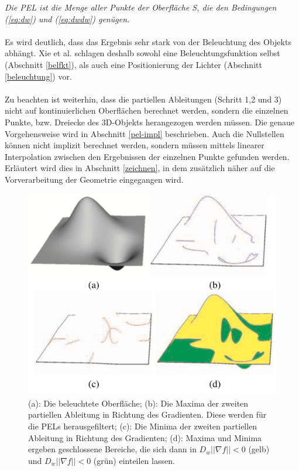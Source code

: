 \documentclass{paperStyle}
\begin{document}
\textit{Die PEL ist die Menge aller Punkte der Oberfläche S, die den Bedingungen (\ref{eq:dw}) und (\ref{eq:dwdw}) genügen.}
\\\\
Es wird deutlich, dass das Ergebnis sehr stark von der Beleuchtung des Objekts abhängt. Xie et al. schlagen deshalb sowohl eine Beleuchtungsfunktion selbst (Abschnitt \ref{belfkt}), als auch eine Positionierung der Lichter (Abschnitt \ref{beleuchtung}) vor.\\\\
Zu beachten ist weiterhin, dass die partiellen Ableitungen (Schritt 1,2 und 3) nicht auf kontinuierlichen Oberflächen berechnet werden, sondern die einzelnen Punkte, bzw. Dreiecke des 3D-Objekts herangezogen werden müssen. Die genaue Vorgehensweise wird in Abschnitt \ref{pel-impl} beschrieben. Auch die Nullstellen können nicht implizit berechnet werden, sondern müssen mittels linearer Interpolation zwischen den Ergebnissen der einzelnen Punkte gefunden werden. Erläutert wird dies in Abschnitt \ref{zeichnen}, in dem zusätzlich näher auf die Vorverarbeitung der Geometrie eingegangen wird.
\begin{figure}
	\centering
		\includegraphics[width=0.7\linewidth]{abcd.png}
	\caption{(a): Die beleuchtete Oberfläche; (b): Die Maxima der zweiten partiellen Ableitung in Richtung des Gradienten. Diese werden für die PELs herausgefiltert; (c): Die Minima der zweiten partiellen Ableitung in Richtung des Gradienten; (d): Maxima und Minima ergeben geschlossene Bereiche, die sich dann in $D_{w}||\nabla f || < 0$ (gelb) und $D_{w}||\nabla f || < 0$ (grün) einteilen lassen.}
	\label{fig:abcd}
\end{figure}
\end{document}
